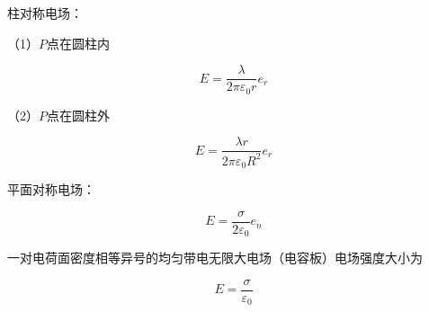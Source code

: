 \begin{example}
	柱对称电场：
	
（1）$P$点在圆柱内

$$ E=\frac{\lambda}{2\pi \varepsilon _{0}r}e_{r}$$

（2）$P$点在圆柱外

$$E =\frac{\lambda r}{2\pi \varepsilon _{0}R^2}e_{r}$$
\end{example}

\begin{example}
	平面对称电场：
	
$$E = \frac{\sigma}{2\varepsilon_0} e_n$$

一对电荷面密度相等异号的均匀带电无限大电场（电容板）电场强度大小为

$$E = \frac{\sigma}{\varepsilon_0} $$
\end{example}
